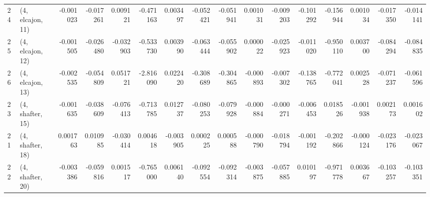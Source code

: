 \begin{tabular}{llrrrrrrrrrrrrrr}
24 &  (4, elcajon, 11) &  -0.001023 & -0.017261 &  0.009121 &  -0.471163 &  0.003497 &  -0.052421 & -0.051941 &  0.001031 & -0.009203 & -0.101292 &  -0.156944 &  0.001034 & -0.017350 & -0.014141 \\
25 &  (4, elcajon, 12) &  -0.001505 & -0.026480 & -0.032903 &  -0.533730 &  0.003990 &  -0.063444 & -0.055902 &  0.000022 & -0.025923 & -0.011020 &  -0.950110 &  0.003700 & -0.084294 & -0.084835 \\
26 &  (4, elcajon, 13) &  -0.002535 & -0.054809 &  0.051721 &  -2.816090 &  0.022420 &  -0.308689 & -0.304865 & -0.000893 & -0.007302 & -0.138765 &  -0.772041 &  0.002528 & -0.071237 & -0.061596 \\
23 &  (4, shafter, 15) &  -0.001635 & -0.038609 & -0.076413 &  -0.713785 &  0.012737 &  -0.080253 & -0.079928 & -0.000884 & -0.000271 & -0.006453 &   0.018526 & -0.001938 &  0.002173 &  0.001602 \\
21 &  (4, shafter, 18) &   0.001763 &  0.010985 & -0.030414 &   0.004618 & -0.003905 &   0.000225 &  0.000588 & -0.000790 & -0.018794 & -0.001192 &  -0.202866 & -0.000124 & -0.023176 & -0.023067 \\
22 &  (4, shafter, 20) &  -0.003386 & -0.059816 &  0.001517 &  -0.765000 &  0.006140 &  -0.092554 & -0.092314 & -0.003875 & -0.057885 &  0.010197 &  -0.971778 &  0.003667 & -0.103257 & -0.103351 \\
\bottomrule
\end{tabular}
